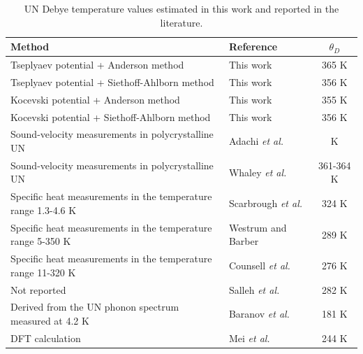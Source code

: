 \documentclass[preprint, 12pt]{elsarticle}
\providecommand{\DIFaddtex}[1]{{\protect\color{blue} \sf #1}} %
\providecommand{\DIFaddFL}[1]{\DIFadd{#1}} %
\providecommand{\DIFaddbeginFL}{} %
\providecommand{\DIFaddendFL}{} %
\providecommand{\DIFadd}[1]{\texorpdfstring{\DIFaddtex{#1}}{#1}} %
\newcommand{\DIFaddincludegraphics}[2][]{{\color{blue}\fbox{\DIFOincludegraphics[#1]{#2}}}} %
\DeclareRobustCommand{\DIFaddbeginFL}{\DIFOaddbeginFL \let\includegraphics\DIFaddincludegraphics} %
\DeclareRobustCommand{\DIFaddendFL}{\DIFOaddendFL \let\includegraphics\DIFOincludegraphics} %
\begin{document}
\begin{table}[h!]
    \centering
    \footnotesize    
    \caption{UN Debye temperature values estimated in this work and reported in the literature.}
    \begin{tabular}{llc}
    \hline
    Method                                  & Reference & $\theta_{D}$ \\
    \hline
    Tseplyaev potential + Anderson method             & This work & 365 K \\
    Tseplyaev potential + Siethoff-Ahlborn method     & This work & 356 K \\ 
    Kocevski potential + Anderson method              & This work & 355 K \\
    Kocevski potential + Siethoff-Ahlborn method      & This work & 356 K \\
    \hline
    Sound-velocity measurements in polycrystalline UN             & \DIFaddbeginFL \DIFaddFL{Adachi \textit{et al.} \cite{Adachi2009}     }& \DIFaddFL{339 K }\\
    \DIFaddFL{Sound-velocity measurements in polycrystalline UN             }& \DIFaddendFL Whaley \textit{et al.} \cite{Whaley1969}     & 361-364 K \\
    Specific heat measurements in the temperature range 1.3-4.6 K & Scarbrough \textit{et al.} \cite{Scarbrough1968} & 324 K \\
    Specific heat measurements in the temperature range 5-350 K   & Westrum and Barber \cite{Westrum1966}   & 289 K \\
    Specific heat measurements in the temperature range 11-320 K  & Counsell \textit{et al.} \cite{Counsell1964}     & 276 K \\
    Not reported                                          & Salleh \textit{et al.} \cite{Salleh1986}   & 282 K \\
    Derived from the UN phonon spectrum measured at 4.2 K & Baranov \textit{et al.} \cite{Baranov2013} & 181 K \\
    DFT calculation                                       & Mei \textit{et al.} \cite{Mei2013}         & 244 K \\
    \hline
    \end{tabular}
    \label{Tab:Debye}
\end{table}
\end{document}
